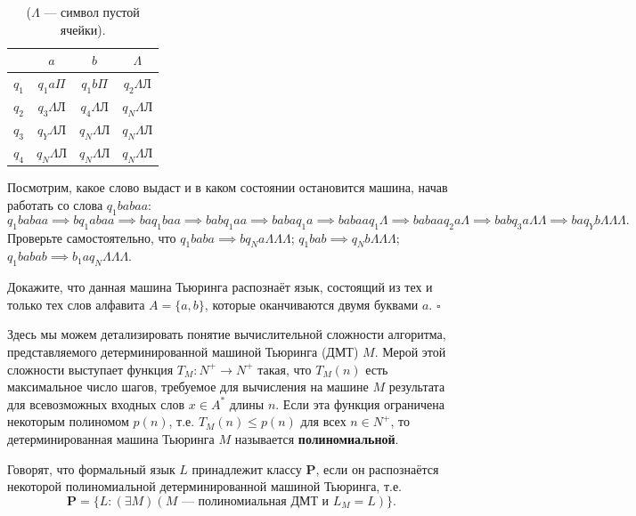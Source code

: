 \documentclass[a4paper,12pt]{article}
\begin{document}
\begin{table}[h]
\centering
\begin{tabular}{|c|c|c|c|}
\hline
 & \(a\) & \(b\) & \(\Lambda\) \\
\hline
\(q_1\) & \(q_1 a \Pi\) & \(q_1 b \Pi\) & \(q_2 \Lambda \text{Л}\) \\
\hline
\(q_2\) & \(q_3 \Lambda \text{Л}\) & \(q_4 \Lambda \text{Л}\) & \(q_N \Lambda \text{Л}\) \\
\hline
\(q_3\) & \(q_Y \Lambda \text{Л}\) & \(q_N \Lambda \text{Л}\) & \(q_N \Lambda \text{Л}\) \\
\hline
\(q_4\) & \(q_N \Lambda \text{Л}\) & \(q_N \Lambda \text{Л}\) & \(q_N \Lambda \text{Л}\) \\
\hline
\end{tabular}
\caption*{(\(\Lambda\) --- символ пустой ячейки).}
\end{table}

Посмотрим, какое слово выдаст и в каком состоянии остановится машина, начав работать со слова \(q_1 babaa\):
\[
q_1 babaa \implies bq_1 abaa \implies baq_1 baa \implies babq_1 aa \implies babaq_1 a \implies babaaq_1 \Lambda \implies babaaq_2 a \Lambda \implies babq_3 a \Lambda \Lambda \implies baq_Y b \Lambda \Lambda \Lambda.
\]
Проверьте самостоятельно, что \(q_1 baba \implies bq_N a \Lambda \Lambda \Lambda\); \(q_1 bab \implies q_N b \Lambda \Lambda \Lambda\); \(q_1 babab \implies b_1 a q_N \Lambda \Lambda \Lambda\).

Докажите, что данная машина Тьюринга распознаёт язык, состоящий из тех и только тех слов алфавита \(A = \{a, b\}\), которые оканчиваются двумя буквами \(a\). \(\square\)

Здесь мы можем детализировать понятие вычислительной сложности алгоритма, представляемого детерминированной машиной Тьюринга (ДМТ) \(M\). Мерой этой сложности выступает функция \(T_M: N^+ \to N^+\) такая, что \(T_M(n)\) есть максимальное число шагов, требуемое для вычисления на машине \(M\) результата для всевозможных входных слов \(x \in A^*\) длины \(n\). Если эта функция ограничена некоторым полиномом \(p(n)\), т.е. \(T_M(n) \le p(n)\) для всех \(n \in N^+\), то детерминированная машина Тьюринга \(M\) называется \textbf{полиномиальной}.

Говорят, что формальный язык \(L\) принадлежит классу \(\mathbf{P}\), если он распознаётся некоторой полиномиальной детерминированной машиной Тьюринга, т.е.
\[
\mathbf{P} = \{L : (\exists M) (M \text{ --- полиномиальная ДМТ и } L_M = L)\}.
\]
\end{document}
